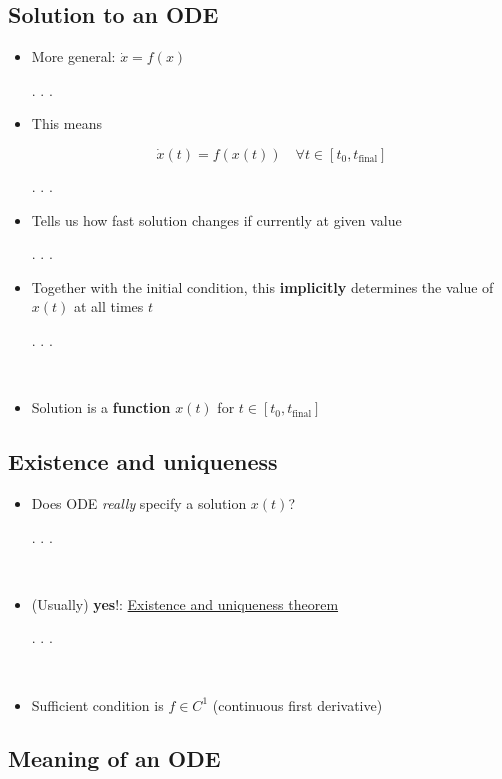 \documentclass[
]{article}
\begin{document}
\hypertarget{solution-to-an-ode}{%
\subsection{Solution to an ODE}\label{solution-to-an-ode}}

\begin{itemize}
\item
  More general: \(\dot{x} = f(x)\)

  . . .
\item
  This means

  \[\dot{x}(t) = f(x(t)) \quad \forall t \in [t_0, t_\text{final}]\]

  . . .
\item
  Tells us how fast solution changes if currently at given value

  . . .
\item
  Together with the initial condition, this \textbf{implicitly}
  determines the value of \(x(t)\) at all times \(t\)

  . . .

  ~\\
\item
  Solution is a \textbf{function} \(x(t)\) for
  \(t \in [t_0, t_\text{final}]\)
\end{itemize}

\hypertarget{existence-and-uniqueness}{%
\subsection{Existence and uniqueness}\label{existence-and-uniqueness}}

\begin{itemize}
\item
  Does ODE \emph{really} specify a solution \(x(t)\)?

  . . .

  ~\\
\item
  (Usually) \textbf{yes}!:
  \href{https://en.wikipedia.org/wiki/Picard\%E2\%80\%93Lindel\%C3\%B6f_theorem}{Existence
  and uniqueness theorem}

  . . .

  ~\\
\item
  Sufficient condition is \(f \in C^1\) (continuous first derivative)
\end{itemize}

\hypertarget{meaning-of-an-ode}{%
\subsection{Meaning of an ODE}\label{meaning-of-an-ode}}
\end{document}
